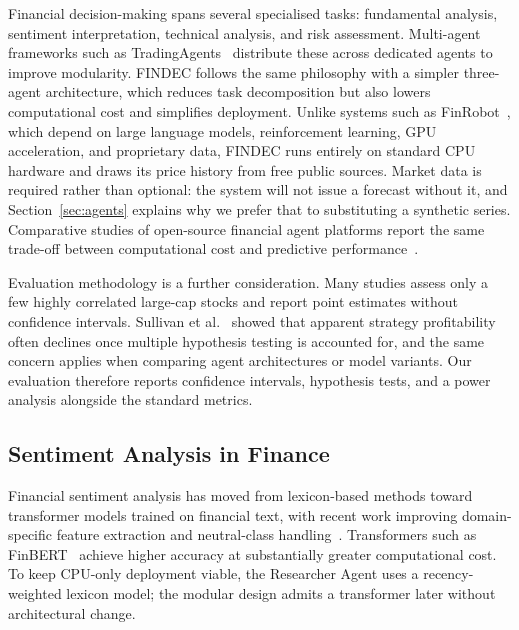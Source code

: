 \documentclass[conference]{IEEEtran}
\begin{document}
Financial decision-making spans several specialised tasks: fundamental analysis, sentiment interpretation, technical analysis, and risk assessment. Multi-agent frameworks such as TradingAgents~\cite{xiao2024tradingagents} distribute these across dedicated agents to improve modularity. FINDEC follows the same philosophy with a simpler three-agent architecture, which reduces task decomposition but also lowers computational cost and simplifies deployment. Unlike systems such as FinRobot~\cite{yang2024finrobot}, which depend on large language models, reinforcement learning, GPU acceleration, and proprietary data, FINDEC runs entirely on standard CPU hardware and draws its price history from free public sources. Market data is required rather than optional: the system will not issue a forecast without it, and Section~\ref{sec:agents} explains why we prefer that to substituting a synthetic series. Comparative studies of open-source financial agent platforms report the same trade-off between computational cost and predictive performance~\cite{zhang2026finworld}.

Evaluation methodology is a further consideration. Many studies assess only a few highly correlated large-cap stocks and report point estimates without confidence intervals. Sullivan et al.~\cite{sullivan1999data} showed that apparent strategy profitability often declines once multiple hypothesis testing is accounted for, and the same concern applies when comparing agent architectures or model variants. Our evaluation therefore reports confidence intervals, hypothesis tests, and a power analysis alongside the standard metrics.

\subsection{Sentiment Analysis in Finance}

Financial sentiment analysis has moved from lexicon-based methods toward transformer models trained on financial text, with recent work improving domain-specific feature extraction and neutral-class handling~\cite{sun2025financial}. Transformers such as FinBERT~\cite{araci2019finbert} achieve higher accuracy at substantially greater computational cost. To keep CPU-only deployment viable, the Researcher Agent uses a recency-weighted lexicon model; the modular design admits a transformer later without architectural change.
\end{document}
